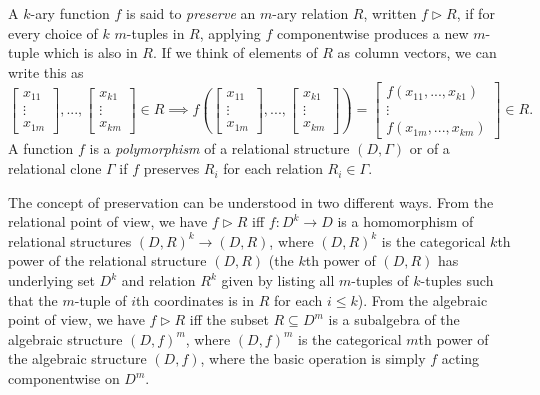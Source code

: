 \begin{defn} A $k$-ary function $f$ is said to \emph{preserve} an $m$-ary relation $R$, written $f \rhd R$, if for every choice of $k$ $m$-tuples in $R$, applying $f$ componentwise produces a new $m$-tuple which is also in $R$. If we think of elements of $R$ as column vectors, we can write this as
\[
\begin{bmatrix} x_{11}\\ \vdots\\ x_{1m} \end{bmatrix}, ..., \begin{bmatrix} x_{k1}\\ \vdots\\ x_{km} \end{bmatrix} \in R \implies f\left( \begin{bmatrix} x_{11}\\ \vdots\\ x_{1m} \end{bmatrix}, ..., \begin{bmatrix} x_{k1}\\ \vdots\\ x_{km} \end{bmatrix}\right) = \begin{bmatrix} f(x_{11}, ..., x_{k1})\\ \vdots\\ f(x_{1m}, ..., x_{km}) \end{bmatrix} \in R.
\]
A function $f$ is a \emph{polymorphism} of a relational structure $(D, \Gamma)$ or of a relational clone $\Gamma$ if $f$ preserves $R_i$ for each relation $R_i \in \Gamma$.
\end{defn}

The concept of preservation can be understood in two different ways. From the relational point of view, we have $f \rhd R$ iff $f : D^k \rightarrow D$ is a homomorphism of relational structures $(D,R)^k \rightarrow (D,R)$, where $(D,R)^k$ is the categorical $k$th power of the relational structure $(D,R)$ (the $k$th power of $(D,R)$ has underlying set $D^k$ and relation $R^k$ given by listing all $m$-tuples of $k$-tuples such that the $m$-tuple of $i$th coordinates is in $R$ for each $i \le k$). From the algebraic point of view, we have $f \rhd R$ iff the subset $R \subseteq D^m$ is a subalgebra of the algebraic structure $(D,f)^m$, where $(D,f)^m$ is the categorical $m$th power of the algebraic structure $(D,f)$, where the basic operation is simply $f$ acting componentwise on $D^m$.

